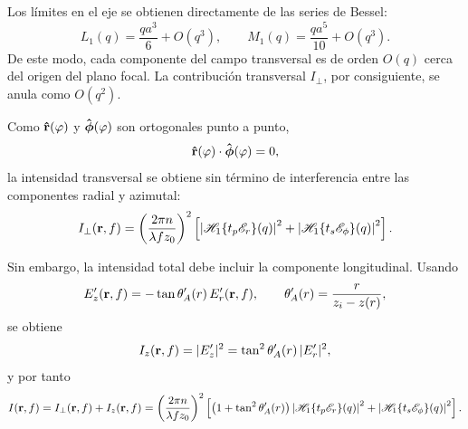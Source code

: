 Los límites en el eje se obtienen directamente de las series de Bessel:
\begin{equation}
  L_1(q)
  =
  \frac{qa^3}{6}
  +
  O(q^3),
  \qquad
  M_1(q)
  =
  \frac{qa^5}{10}
  +
  O(q^3).
  \label{eq:L1_M1_small_q}
\end{equation}
De este modo, cada componente del campo transversal es de orden \(O(q)\) cerca del origen del plano focal. La contribución transversal \(I_\perp\), por consiguiente, se anula como \(O(q^2)\).

Como \(\bm{\hat{\mathbf{r}}}(\varphi)\) y \(\bm{\hat{\mathbf{\phi}}}(\varphi)\) son ortogonales punto a punto,
\begin{equation}
  \bm{\hat{\mathbf{r}}}(\varphi)\cdot\bm{\hat{\mathbf{\phi}}}(\varphi)=0,
\end{equation}
la intensidad transversal se obtiene sin término de interferencia entre las componentes radial y azimutal:
\begin{equation}
  I_\perp(\vb r,f)
  =
  \left(
  \frac{2\pi n}{\lambda f z_0}
  \right)^2
  \left[
  \left|
  \mathscr H_1\{t_p\mathscr E_r\}(q)
  \right|^2
  +
  \left|
  \mathscr H_1\{t_s\mathscr E_\phi\}(q)
  \right|^2
  \right].
\label{eq:I_perp_cylindrical}
\end{equation}

Sin embargo, la intensidad total debe incluir la componente longitudinal. Usando
\begin{equation}
E'_z(\vb r,f)=-\tan\theta_A'(r)\,E'_r(\vb r,f),
\qquad
\theta_A'(r)=\frac{r}{z_i-z(r)},
\label{eq:Ez_from_Er_cylindrical}
\end{equation}
se obtiene
\begin{equation}
I_z(\vb r,f)=|E'_z|^2=\tan^2\theta_A'(r)\,|E'_r|^2,
\label{eq:Iz_cylindrical}
\end{equation}
y por tanto
\begin{equation}
I(\vb r,f)=I_\perp(\vb r,f)+I_z(\vb r,f)
=
\left(
\frac{2\pi n}{\lambda f z_0}
\right)^2
\left[
\left(1+\tan^2\theta_A'(r)\right)
\left|
\mathscr H_1\{t_p\mathscr E_r\}(q)
\right|^2
+
\left|
\mathscr H_1\{t_s\mathscr E_\phi\}(q)
\right|^2
\right].
\label{eq:I_total_cylindrical}
\end{equation}

